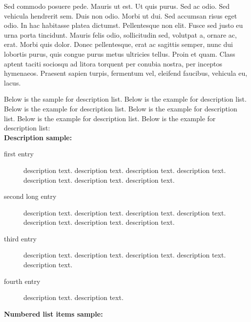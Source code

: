 \documentclass[APA,STIX1COL]{WileyNJD-v2}
\begin{document}
Sed commodo posuere pede. Mauris ut est. Ut quis purus. Sed ac odio. Sed vehicula hendrerit sem. Duis non
odio. Morbi ut dui. Sed accumsan risus eget odio. In hac habitasse platea dictumst. Pellentesque non elit. Fusce
sed justo eu urna porta tincidunt. Mauris felis odio, sollicitudin sed, volutpat a, ornare ac, erat. Morbi quis dolor. Donec pellentesque, erat ac sagittis semper, nunc dui lobortis purus, quis congue purus metus ultricies tellus. Proin
et quam. Class aptent taciti sociosqu ad litora torquent per conubia nostra, per inceptos hymenaeos. Praesent sapien
turpis, fermentum vel, eleifend faucibus, vehicula eu, lacus.


Below is the sample for description list. Below is the example for description list. Below is the example for description list. Below is the example for description list. Below is the example for description list. Below is the example for description list:\\[12pt]


\noindent\textbf{Description sample:}

\begin{description}
\item[first entry] description text. description text. description text. description text. description text. description text. description text. 
\item[second long entry] description text. description text. description text. description text. description text. description text. description text. 
\item[third entry] description text. description text. description text. description text. description text. 
\item[fourth entry] description text. description text. 
\end{description}


\noindent\textbf{Numbered list items sample:}
\end{document}
